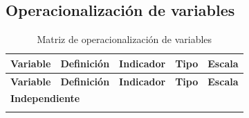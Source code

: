 \begin{landscape} %
\subsection{Operacionalización de variables}

\begin{longtable}{p{4cm}p{6.5cm}p{5cm}p{3cm}p{2.5cm}}
    \caption{Matriz de operacionalización de variables} 
    \label{tab:matriz_operacionalizacion} \\

    \hline
    \textbf{Variable} & \textbf{Definición} & \textbf{Indicador} & \textbf{Tipo} & \textbf{Escala} \\
    \hline
    \endfirsthead

    \hline
    \textbf{Variable} & \textbf{Definición} & \textbf{Indicador} & \textbf{Tipo} & \textbf{Escala} \\
    \hline
    \multicolumn{5}{l}{\textbf{Independiente}} \\
    \hline
    \endhead

    \hline
    \endfoot

    \hline
    \endlastfoot


\end{longtable}
\end{landscape}
